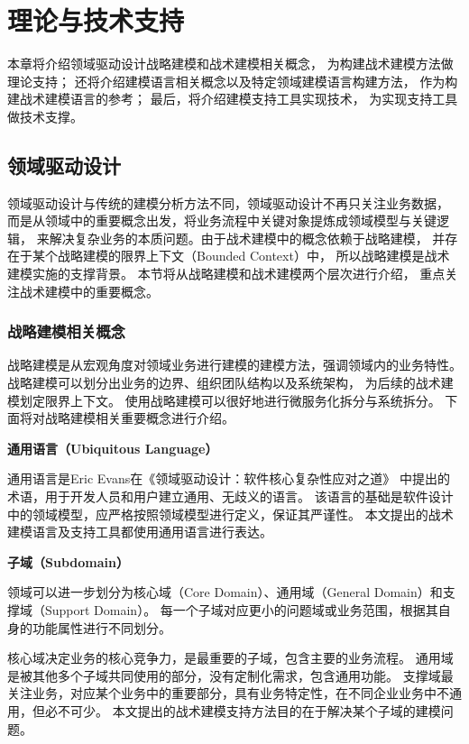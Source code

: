 \chapter{理论与技术支持}

本章将介绍领域驱动设计战略建模和战术建模相关概念，
为构建战术建模方法做理论支持；
还将介绍建模语言相关概念以及特定领域建模语言构建方法，
作为构建战术建模语言的参考；
最后，将介绍建模支持工具实现技术，
为实现支持工具做技术支撑。


\section{领域驱动设计}

领域驱动设计与传统的建模分析方法不同，领域驱动设计不再只关注业务数据，
而是从领域中的重要概念出发，将业务流程中关键对象提炼成领域模型与关键逻辑，
来解决复杂业务的本质问题。由于战术建模中的概念依赖于战略建模，
并存在于某个战略建模的限界上下文（Bounded Context）中，
所以战略建模是战术建模实施的支撑背景。
本节将从战略建模和战术建模两个层次进行介绍，
重点关注战术建模中的重要概念。

\subsection{战略建模相关概念}


战略建模是从宏观角度对领域业务进行建模的建模方法，强调领域内的业务特性。
战略建模可以划分出业务的边界、组织团队结构以及系统架构，
为后续的战术建模划定限界上下文。
使用战略建模可以很好地进行微服务化拆分\cite{DBLP:conf/icsa/MersonY20}与系统拆分。
下面将对战略建模相关重要概念进行介绍。


\textbf{通用语言（Ubiquitous Language）}

通用语言是Eric Evans在《领域驱动设计：软件核心复杂性应对之道》\cite{DBLP:books/daglib/0013521}
中提出的术语，用于开发人员和用户建立通用、无歧义的语言。
该语言的基础是软件设计中的领域模型，应严格按照领域模型进行定义，保证其严谨性。
本文提出的战术建模语言及支持工具都使用通用语言进行表达。

\textbf{子域（Subdomain）}

领域可以进一步划分为核心域（Core Domain）、通用域（General Domain）和支撑域（Support Domain）。
每一个子域对应更小的问题域或业务范围，根据其自身的功能属性进行不同划分。

核心域决定业务的核心竞争力，是最重要的子域，包含主要的业务流程。
通用域是被其他多个子域共同使用的部分，没有定制化需求，包含通用功能。
支撑域最关注业务，对应某个业务中的重要部分，具有业务特定性，在不同企业业务中不通用，但必不可少。
本文提出的战术建模支持方法目的在于解决某个子域的建模问题。

